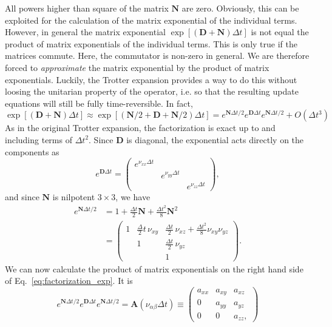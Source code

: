 \documentclass[12pt,letter]{article}
\renewcommand{\vec}[1]{\mathbf{#1}}
\begin{document}
All powers higher than square of the matrix $\vec N$ are zero. Obviously, this can be exploited
for the calculation of the matrix exponential of the individual terms. However, in general
the matrix exponential $\exp[(\vec D + \vec N)\Delta t]$ is not equal the product of matrix exponentials
of the individual terms. This is only true if the matrices commute. Here, the commutator is non-zero in general. We are therefore forced to {\em approximate} the matrix exponential by the product 
of matrix exponentials. Luckily, the Trotter expansion provides a way to do this without loosing
the unitarian property of the operator, i.e. so that the resulting update equations will still be fully
time-reversible. In fact,
\begin{equation}
\exp[(\vec D + \vec N)\Delta t] \approx \exp[(\vec N/2 + \vec D + \vec N/2) \Delta t]
= e^{\vec N \Delta t/2} e^{\vec D \Delta t} e^{\vec N \Delta t/2} + O(\Delta t^3)
\label{eq:factorization_exp}
\end{equation}
As in the original Trotter expansion, the factorization is exact up to and including terms of $\Delta t^2$.
Since $\vec{D}$ is diagonal, the exponential acts directly on the components as
\begin{equation}
e^{\vec D\Delta t} = \left(\begin{matrix}
e^{\nu_{xx} \Delta t} & &\\
&e^{\nu_{yy} \Delta t} &\\
&&e^{\nu_{zz} \Delta t}\end{matrix}\right),
\end{equation}
and since $\vec N$ is nilpotent $3\times3$, we have
\begin{align}
e^{\vec N \Delta t/2} &= 1 + \frac{\Delta t}{2} \vec N + \frac{\Delta t^2}{8} \vec N^2\\
&=\left(\begin{matrix}
1 & \frac{\Delta}2 t\, \nu_{xy} & \frac{\Delta t}2\, \nu_{xz} + \frac{\Delta t^2}{8} \nu_{xy} \nu_{yz}\\
&1&\frac{\Delta t}2\, \nu_{yz} \\
&&1\end{matrix}\right).
\end{align}
We can now calculate the product of matrix exponentials on the right hand side of Eq.~\eqref{eq:factorization_exp}. It is
\begin{equation}
e^{\vec N \Delta t/2} e^{\vec D \Delta t} e^{\vec N \Delta t/2} = \vec A(\nu_{\alpha\beta}\Delta t) \equiv
\left(
\begin{matrix}
a_{xx} & a_{xy} & a_{xz} \\
0 & a_{yy} & a_{yz} \\
0 & 0 & a_{zz},\label{eq:matrix_exp_1}
\end{matrix}\right)
\end{equation}
\end{document}
